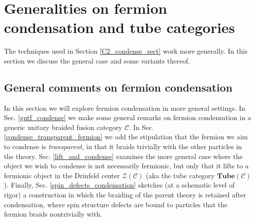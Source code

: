 \documentclass[12pt,a4paper]{article}
\newcommand{\mcz}{\mathcal{Z}}
\newcommand{\mcc}{\mathcal{C}}
\newcommand{\tube}{\textbf{Tube}}
\begin{document}
\section{Generalities on fermion condensation and tube categories} \label{generalities} 

The techniques used in Section \ref{C2_condense_sect} work more generally.
In this section we discuss the general case and some variants thereof.

\subsection{General comments on fermion condensation}

In this section we will explore fermion condensation in more general settings. 
In Sec. \ref{gntf_condense} we make some general remarks on fermion condensation in a
generic unitary braided fusion category $\mcc$. 
In Sec. \ref{condense_transparent_fermion} we add the stipulation that the fermion we aim 
to condense is {\it transparent}, in that it braids trivially with the other particles in the theory. 
Sec. \ref{lift_and_condense} examines the more general case where the object we wish to condense is 
not necessarily fermionic, but only that it lifts to a fermionic object in the Drinfeld center $\mcz(\mcc)$ 
(aka the tube category $\tube(\mcc)$).
Finally, Sec. \ref{spin_defects_condensation} sketches (at a schematic level of rigor) a construction in which the braiding 
of the parent theory is retained after condensation, where spin structure defects are bound to 
particles that the fermion braids nontrivially with. 
\end{document}
